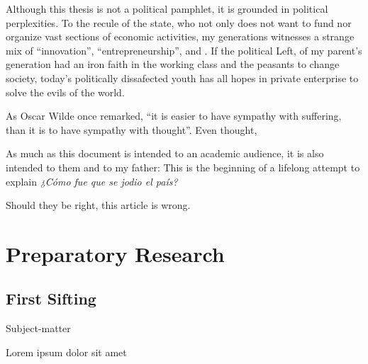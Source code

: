 \documentclass[paper=B6,portrait,twoside=true,twocolumn=false,headinclude=true,footinclude=false,fontsize=12,BCOR=10mm,DIV=calc,pagesize=auto,titlepage=firstiscover,mpinclude=false,headings=normal,headings=twolinechapter,open=right,toc=graduated,chapterprefix=false,numbers=endperiod,parskip=half+]{scrbook}
\theoremstyle{definition}
\begin{document}
Although this thesis is not a political pamphlet, it is grounded in
political perplexities. To the recule of the state, who not only does not
want to fund nor organize vast sections of economic activities, my
generations witnesses a strange mix of ``innovation'',
``entrepreneurship'', and . If the political Left, of my parent's
generation had an iron faith in the working class and the peasants to
change society, today's politically dissafected youth has all hopes in
private enterprise to solve the evils of the world.

As Oscar Wilde once remarked, ``it is easier to have sympathy with
suffering, than it is to have sympathy with thought''. Even thought,

As much as this document is intended to an academic audience, it is also
intended to them and to my father: This is the beginning of a lifelong
attempt to explain \emph{¿Cómo fue que se jodio el país?} 

Should they be right, this article is wrong. 

\mainmatter
\pagestyle{scrheadings}
\part{Preparatory Research}
\label{sec:org704f466}
\chapter{First Sifting}
\label{sec:orgb3944e7}
   \begin{labeling}[~]{Subject-matter} 
\item[Subject-matter] Lorem ipsum dolor sit amet
\end{labeling}
\end{document}
